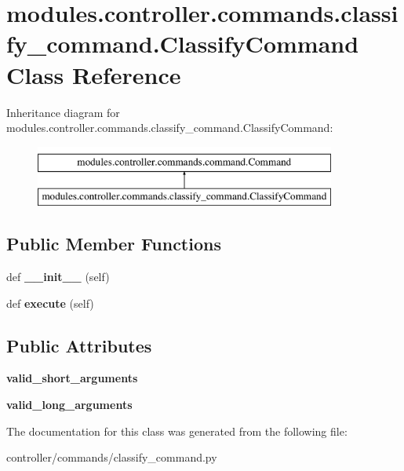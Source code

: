 \hypertarget{classmodules_1_1controller_1_1commands_1_1classify__command_1_1_classify_command}{}\section{modules.\+controller.\+commands.\+classify\+\_\+command.\+Classify\+Command Class Reference}
\label{classmodules_1_1controller_1_1commands_1_1classify__command_1_1_classify_command}
Inheritance diagram for modules.\+controller.\+commands.\+classify\+\_\+command.\+Classify\+Command\+:\begin{figure}[H]
\begin{center}
\leavevmode
\includegraphics[height=2.000000cm]{classmodules_1_1controller_1_1commands_1_1classify__command_1_1_classify_command}
\end{center}
\end{figure}
\subsection*{Public Member Functions}
\begin{DoxyCompactItemize}
\item 
\mbox{\label{classmodules_1_1controller_1_1commands_1_1classify__command_1_1_classify_command_a5cf93580acc5001252e29c0915a340db}} 
def {\bfseries \+\_\+\+\_\+init\+\_\+\+\_\+} (self)
\item 
\mbox{\label{classmodules_1_1controller_1_1commands_1_1classify__command_1_1_classify_command_aadfaa6d8d2e9556fc3eb932b54fd90cc}} 
def {\bfseries execute} (self)
\end{DoxyCompactItemize}
\subsection*{Public Attributes}
\begin{DoxyCompactItemize}
\item 
\mbox{\label{classmodules_1_1controller_1_1commands_1_1classify__command_1_1_classify_command_aea24b2fa5eb12619de96167f5b45c75b}} 
{\bfseries valid\+\_\+short\+\_\+arguments}
\item 
\mbox{\label{classmodules_1_1controller_1_1commands_1_1classify__command_1_1_classify_command_aff133fd7d0b56e62e62581029c1e3096}} 
{\bfseries valid\+\_\+long\+\_\+arguments}
\end{DoxyCompactItemize}


The documentation for this class was generated from the following file\+:\begin{DoxyCompactItemize}
\item 
controller/commands/classify\+\_\+command.\+py\end{DoxyCompactItemize}
